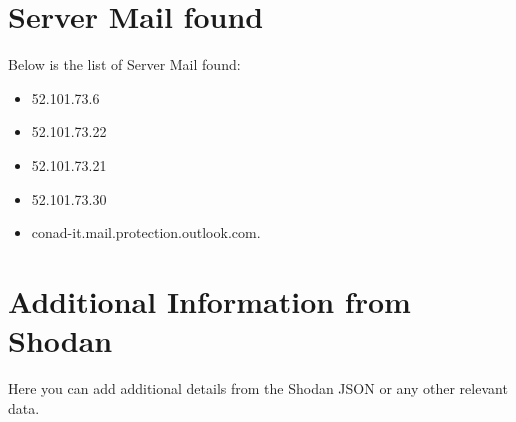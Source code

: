 \documentclass{article}
\begin{document}
\section*{Server Mail found}

Below is the list of Server Mail found:

\begin{itemize}
    
        \item 52.101.73.6
    
        \item 52.101.73.22
    
        \item 52.101.73.21
    
        \item 52.101.73.30
    
        \item conad-it.mail.protection.outlook.com.
    
\end{itemize}

\section*{Additional Information from Shodan}

Here you can add additional details from the Shodan JSON or any other relevant data.
\end{document}
